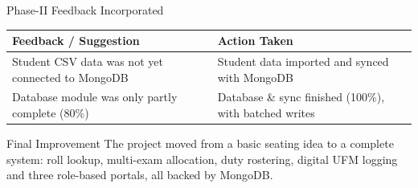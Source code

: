 \documentclass[aspectratio=169,11pt]{beamer}
\begin{document}
\begin{frame}{Phase-II Feedback Incorporated}

\scriptsize

\begin{center}

\renewcommand{\arraystretch}{1.35}

\begin{tabularx}{.96\textwidth}
{@{}p{5.6cm}X@{}}

\toprule
\textbf{Feedback / Suggestion} &
\textbf{Action Taken}\\
\midrule

Student CSV data was not yet connected to MongoDB &
Student data imported and synced with MongoDB\\

Database module was only partly complete (80\%) &
Database \& sync finished (100\%), with batched writes\\

\bottomrule

\end{tabularx}

\end{center}

\vfill

\begin{block}{Final Improvement}
\small
The project moved from a basic seating idea to a complete system: roll lookup,
multi-exam allocation, duty rostering, digital UFM logging and three
role-based portals, all backed by MongoDB.
\end{block}

\end{frame}
\end{document}
